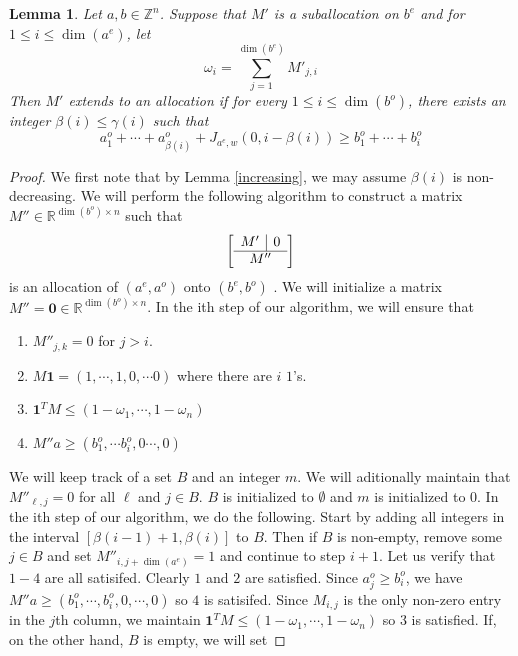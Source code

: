 \documentclass[10pt,a4paper]{amsart}
\newtheorem{lemma}{Lemma}
\begin{document}
\begin{lemma}\label{extends} Let $a, b \in \mathbb{Z}^n$. Suppose that $M'$ is a suballocation on $b^e$ and for $1 \leq i \leq \dim(a^e)$, let
\[
\omega_i = \sum_{j = 1}^{\dim(b^e)} M'_{j, i}
\]
Then $M'$ extends to an allocation if for every $1 \leq i \leq \dim(b^o)$, there exists an integer $\beta(i) \leq \gamma(i)$ such that
\[
a^o_1 + \cdots + a^o_{\beta(i)} + J_{a^e, w} (0, i - \beta(i)) \geq b^o_1 + \cdots + b^o_i
\]
\end{lemma}

\begin{proof}
We first note that by Lemma \ref{increasing}, we may assume $\beta(i)$ is non-decreasing. We will perform the following algorithm to construct a matrix $M'' \in \mathbb{R}^{\dim(b^o) \times n}$ such that
\[
\left[
\begin{array}{c|c}
M' & 0 \\
\hline
\multicolumn{2}{c}{M''}
\end{array}
\right]
\]
is an allocation of $(a^e, a^o)$ onto $(b^e, b^o)$ . We will initialize a matrix $ M'' = \boldsymbol{0} \in \mathbb{R}^{\dim(b^o) \times n}$. In the ith step of our algorithm, we will ensure that
\begin{enumerate}
\item $M''_{j, k} = 0$ for $j > i$.
\item $M \boldsymbol{1} = (1, \cdots, 1, 0, \cdots 0)$ where there are $i$ $1$'s.
\item $\boldsymbol{1}^T M \leq ( 1- \omega_1, \cdots, 1 - \omega_n)$
\item $M'' a \geq (b^o_1, \cdots b^o_i, 0 \cdots, 0)$
\end{enumerate}
We will keep track of a set $B$ and an integer $m$. We will aditionally maintain that $M''_{\ell,j} = 0$ for all $\ell$ and $j \in B$. $B$ is initialized to $ \emptyset$ and $m$ is initialized to $0$. In the ith step of our algorithm, we do the following. Start by adding all integers in the interval $ [\beta(i - 1) + 1, \beta(i) ]$ to $B$. Then if $B$ is non-empty, remove some $j \in B$ and set $M''_{i, j + \dim(a^e)} = 1$ and continue to step $i + 1$. Let us verify that $1-4$ are all satisifed. Clearly $1$ and $2$ are satisfied. Since $a^o_{j} \geq b^o_i$, we have $M'' a \geq ( b^o_1, \cdots, b^o_i, 0, \cdots, 0)$ so $4$ is satisifed. Since $M_{i, j}$ is the only non-zero entry in the $j$th column, we maintain $ \boldsymbol{1}^T M \leq (1 - \omega_1, \cdots, 1 - \omega_n)$ so $3$ is satisfied.
\medskip
If, on the other hand, $B$ is empty, we will set

\end{proof}
\end{document}
